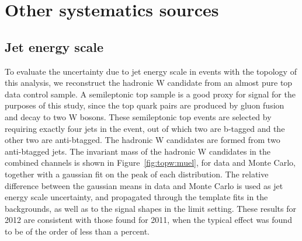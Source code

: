 \section{Other systematics sources}
\label{sec:systematics}


\subsection{Jet energy scale}


To evaluate the uncertainty due to jet energy scale in events with the
topology of this analysis, we reconstruct the hadronic W candidate
from an almost pure top data control sample.  A semileptonic top
sample is a good proxy for signal for the purposes of this study,
since the top quark pairs are produced by gluon fusion and decay to
two W bosons. These semileptonic top events are selected by requiring
exactly four jets in the event, out of which two are b-tagged and the
other two are anti-btagged. The hadronic W candidates are formed from
two anti-btagged jets.  The invariant mass of the hadronic W
candidates in the combined channels is shown in
Figure~\ref{fig:topw:muel}, for data and Monte Carlo, together with a
gaussian fit on the peak of each distribution.  The relative
difference between the gaussian means in data and Monte Carlo is used
as jet energy scale uncertainty, and propagated through the template
fits in the backgrounds, as well as to the signal shapes in the limit
setting. These results for 2012 are consistent with those found for
2011, when the typical effect was found to be of the order of less
than a percent.

